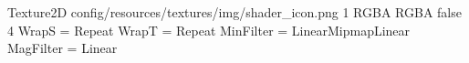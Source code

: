 Texture2D
config/resources/textures/img/shader_icon.png
1
RGBA
RGBA
false
4
WrapS = Repeat
WrapT = Repeat
MinFilter = LinearMipmapLinear
MagFilter = Linear
